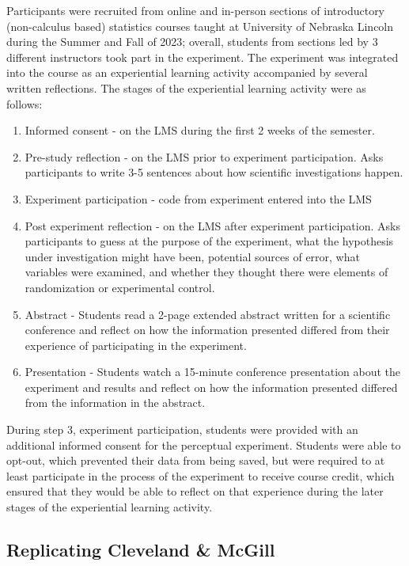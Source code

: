 \documentclass[runningheads
]{llncs}
\providecommand{\tightlist}{%
  \setlength{\itemsep}{0pt}\setlength{\parskip}{0pt}}\usepackage{longtable,booktabs,array}
\begin{document}
Participants were recruited from online and in-person sections of
introductory (non-calculus based) statistics courses taught at
University of Nebraska Lincoln during the Summer and Fall of 2023;
overall, students from sections led by 3 different instructors took part
in the experiment. The experiment was integrated into the course as an
experiential learning activity accompanied by several written
reflections. The stages of the experiential learning activity were as
follows:

\begin{enumerate}
\def\labelenumi{\arabic{enumi}.}
\tightlist
\item
  Informed consent - on the LMS during the first 2 weeks of the
  semester.
\item
  Pre-study reflection - on the LMS prior to experiment participation.
  Asks participants to write 3-5 sentences about how scientific
  investigations happen.
\item
  Experiment participation - code from experiment entered into the LMS
\item
  Post experiment reflection - on the LMS after experiment
  participation. Asks participants to guess at the purpose of the
  experiment, what the hypothesis under investigation might have been,
  potential sources of error, what variables were examined, and whether
  they thought there were elements of randomization or experimental
  control.
\item
  Abstract - Students read a 2-page extended abstract written for a
  scientific conference and reflect on how the information presented
  differed from their experience of participating in the experiment.
\item
  Presentation - Students watch a 15-minute conference presentation
  about the experiment and results and reflect on how the information
  presented differed from the information in the abstract.
\end{enumerate}

During step 3, experiment participation, students were provided with an
additional informed consent for the perceptual experiment. Students were
able to opt-out, which prevented their data from being saved, but were
required to at least participate in the process of the experiment to
receive course credit, which ensured that they would be able to reflect
on that experience during the later stages of the experiential learning
activity.

\hypertarget{replicating-cleveland-mcgill}{%
\subsection{Replicating Cleveland \&
McGill}\label{replicating-cleveland-mcgill}}
\end{document}

